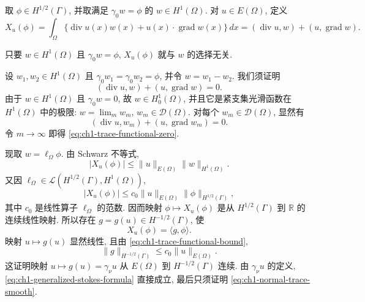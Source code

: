 \begin{Proof}
取 $\phi\in H^{1/2}(\Gamma)$, 并取满足 $\gamma_0w=\phi$ 的 $w\in H^1(\Omega)$. 对 $u\in E(\Omega)$, 定义
\[
X_u(\phi)=\int_\Omega\{\operatorname{div}u(x)w(x)+u(x)\cdot\operatorname{grad}w(x)\}\,dx
=(\operatorname{div}u,w)+(u,\operatorname{grad}w).
\]

\begin{Lemma}
\label{lem:ch1-trace-functional-independent}
只要 $w\in H^1(\Omega)$ 且 $\gamma_0w=\phi$, $X_u(\phi)$ 就与 $w$ 的选择无关.
\end{Lemma}

\begin{Proof}
设 $w_1,w_2\in H^1(\Omega)$ 且 $\gamma_0w_1=\gamma_0w_2=\phi$, 并令 $w=w_1-w_2$. 我们须证明
\begin{equation}
(\operatorname{div}u,w)+(u,\operatorname{grad}w)=0.
\label{eq:ch1-trace-functional-zero}
\end{equation}
由于 $w\in H^1(\Omega)$ 且 $\gamma_0w=0$, 故 $w\in H_0^1(\Omega)$, 并且它是紧支集光滑函数在 $H^1(\Omega)$ 中的极限: $w=\lim_m w_m$, $w_m\in\mathcal D(\Omega)$. 对每个 $w_m\in\mathcal D(\Omega)$, 显然有
\[
(\operatorname{div}u,w_m)+(u,\operatorname{grad}w_m)=0.
\]
令 $m\to\infty$ 即得 \eqref{eq:ch1-trace-functional-zero}.
\end{Proof}

现取 $w=\ell_\Omega\phi$. 由 Schwarz 不等式,
\[
\lvert X_u(\phi)\rvert\leq\lVert u\rVert_{E(\Omega)}\lVert w\rVert_{H^1(\Omega)}.
\]
又因 $\ell_\Omega\in\mathcal L(H^{1/2}(\Gamma),H^1(\Omega))$,
\begin{equation}
\lvert X_u(\phi)\rvert
\leq c_0\lVert u\rVert_{E(\Omega)}\lVert\phi\rVert_{H^{1/2}(\Gamma)},
\label{eq:ch1-trace-functional-bound}
\end{equation}
其中 $c_0$ 是线性算子 $\ell_\Omega$ 的范数. 因而映射 $\phi\mapsto X_u(\phi)$ 是从 $H^{1/2}(\Gamma)$ 到 $\mathbb R$ 的连续线性映射. 所以存在 $g=g(u)\in H^{-1/2}(\Gamma)$, 使
\begin{equation}
X_u(\phi)=\langle g,\phi\rangle.
\label{eq:ch1-normal-trace-duality-definition}
\end{equation}
映射 $u\mapsto g(u)$ 显然线性, 且由 \eqref{eq:ch1-trace-functional-bound},
\begin{equation}
\lVert g\rVert_{H^{-1/2}(\Gamma)}
\leq c_0\lVert u\rVert_{E(\Omega)}.
\label{eq:ch1-normal-trace-bound}
\end{equation}
这证明映射 $u\mapsto g(u)=\gamma_\nu u$ 从 $E(\Omega)$ 到 $H^{-1/2}(\Gamma)$ 连续. 由 $\gamma_\nu u$ 的定义, \eqref{eq:ch1-generalized-stokes-formula} 直接成立, 最后只须证明 \eqref{eq:ch1-normal-trace-smooth}.


\end{Proof}
